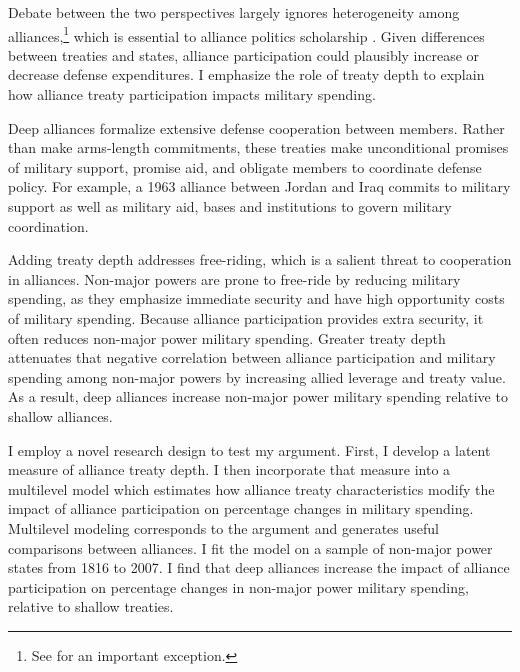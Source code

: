 \documentclass[12pt]{article}
\begin{document}
Debate between the two perspectives largely ignores heterogeneity among alliances,\footnote{See \citet{DigiuseppePoast2016} for an important exception.} which is essential to alliance politics scholarship \citep{Morrow1991, Leeds2003, LeedsAnac2005, Fordham2010, Mattes2012, Benson2012, Poast2013, Johnsonetal2015}.  
Given differences between treaties and states, alliance participation could plausibly increase or decrease defense expenditures. 
I emphasize the role of treaty depth to explain how alliance treaty participation impacts military spending. 


Deep alliances formalize extensive defense cooperation between members.
Rather than make arms-length commitments, these treaties make unconditional promises of military support, promise aid, and obligate members to coordinate defense policy. 
For example, a 1963 alliance between Jordan and Iraq commits to military support as well as military aid, bases and institutions to govern military coordination. 


Adding treaty depth addresses free-riding, which is a salient threat to cooperation in alliances. 
Non-major powers are prone to free-ride by reducing military spending, as they emphasize immediate security and have high opportunity costs of military spending. 
Because alliance participation provides extra security, it often reduces non-major power military spending. 
Greater treaty depth attenuates that negative correlation between alliance participation and military spending among non-major powers by increasing allied leverage and treaty value. 
As a result, deep alliances increase non-major power military spending relative to shallow alliances. 
 

I employ a novel research design to test my argument.
First, I develop a latent measure of alliance treaty depth. 
I then incorporate that measure into a multilevel model which estimates how alliance treaty characteristics modify the impact of alliance participation on percentage changes in military spending.
Multilevel modeling corresponds to the argument and generates useful comparisons between alliances. 
I fit the model on a sample of non-major power states from 1816 to 2007. 
I find that deep alliances increase the impact of alliance participation on percentage changes in non-major power military spending, relative to shallow treaties.
\end{document}
